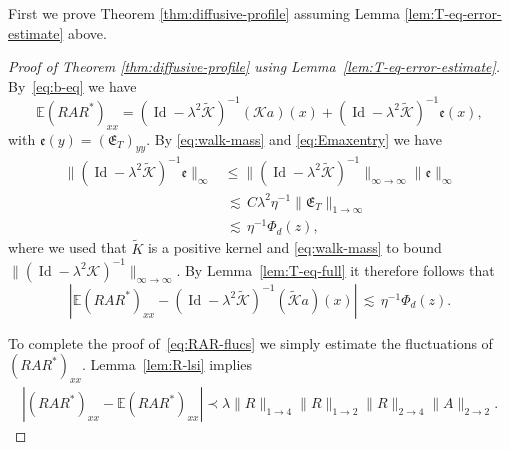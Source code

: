 \documentclass[11pt]{amsart}
\def\Expec{{\mathbb E}}
\newcommand{\Id}{{\operatorname*{Id}}}
\def\lsim{{\,\lesssim\,}}
\newcommand{\mcal}[1]{{\mathcal{#1}}}
\newcommand{\ldom}{\prec}
\numberwithin{equation}{section}
\numberwithin{theorem}{section}
\begin{document}
First we prove Theorem \ref{thm:diffusive-profile} assuming Lemma \ref{lem:T-eq-error-estimate} above.
\begin{proof}[Proof of Theorem \ref{thm:diffusive-profile} using Lemma~\ref{lem:T-eq-error-estimate}]
By~\eqref{eq:b-eq} we have
$$\Expec (RAR^*)_{xx} = (\Id -\lambda^2 \tilde{\mcal{K}})^{-1} (\mcal{K}a)(x)
+ (\Id-\lambda^2\tilde{\mathcal{K}})^{-1}\mathfrak{e}(x),$$
with $\mathfrak{e}(y) = (\mathfrak{E}_T)_{yy}$.  By \eqref{eq:walk-mass} and \eqref{eq:Emaxentry} we have
\begin{align*}
\|(\Id-\lambda^2\tilde{\mathcal{K}})^{-1}\mathfrak{e}\|_{\infty}
& \leq \|(\Id-\lambda^2\tilde{\mathcal{K}})^{-1}\|_{\infty\to\infty} \|\mathfrak{e}\|_{\infty}\\
& \lsim C\lambda^2\eta^{-1} \|\mathfrak{E}_T\|_{1\to \infty}\\
& \lsim \eta^{-1} \Phi_d(z),
\end{align*}
where we used that $\tilde{K}$ is a positive
kernel and \eqref{eq:walk-mass} to bound $\|(\Id-\lambda^2\mathcal{K})^{-1}\|_{\infty\to\infty}$.
By Lemma~\ref{lem:T-eq-full} it therefore follows that
\[
|\Expec (RAR^*)_{xx} - (\Id-\lambda^2\tilde{\mcal{K}})^{-1}(\tilde{\mcal{K}}a)(x)|
\lsim \eta^{-1}\Phi_d(z).
\]

To complete the proof of~\eqref{eq:RAR-flucs} we simply estimate the fluctuations of $(RAR^*)_{xx}$.
Lemma~\ref{lem:R-lsi} implies
\begin{align*}
|(RAR^*)_{xx} - \Expec (RAR^*)_{xx}| \ldom
\lambda \|R\|_{1\to 4} \|R\|_{1\to 2} \|R\|_{2\to 4} \|A\|_{2\to 2}.
\end{align*}


\end{proof}
\end{document}
